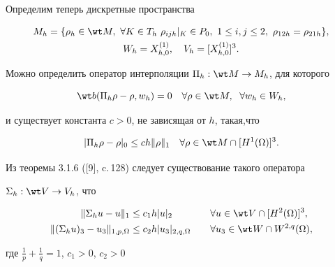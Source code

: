 Определим теперь дискретные пространства


\begin{gather*}


M_h=\{\rho_h\in\wt M,\ \forall K\in T_h \ \rho_{ijh}|_K\in P_0,


\ 1\le i,j\le 2,\ \rho_{12h}=\rho_{21h}\},\\


%


W_h=X_{h,0}^{(1)},\quad V_h=[X_{h,0}^{(1)}]^3.


\end{gather*}





Можно определить оператор интерполяции $\Pi_h:\wt M\to M_h$, для которого


\begin{equation}


\wt b(\Pi_h\rho-\rho,w_h)=0\quad\forall \rho \in \wt M,


\; \ \forall w_h \in W_h,


\end{equation}


и существует константа $c>0$, не зависящая от $h$, такая,что


\begin{equation}


|\Pi_h\rho-\rho|_0\le ch\|\rho\|_1\quad


\forall \rho \in \wt M\cap [H^1(\Omega)]^3.


\end{equation}


Из теоремы 3.1.6 ([9], c.\,128) следует существование такого оператора


$\Sigma_h:\wt V \to V_h$, что


\begin{alignat}{2}


\|\Sigma_h u-u\|_1&\le c_1 h|u|_2 &\quad


&\forall u \in \wt V\cap [H^2(\Omega)]^3,\\


%


\|(\Sigma_h u)_3-u_3\|_{1,p,\Omega}&\le c_2 h|u_3|_{2,q,\Omega} &\quad


&\forall u_3 \in \wt W\cap W^{2,q}(\Omega),


\end{alignat}


где $\frac{1}{p} + \frac{1}{q} =1$, $c_1>0$, $c_2>0$



